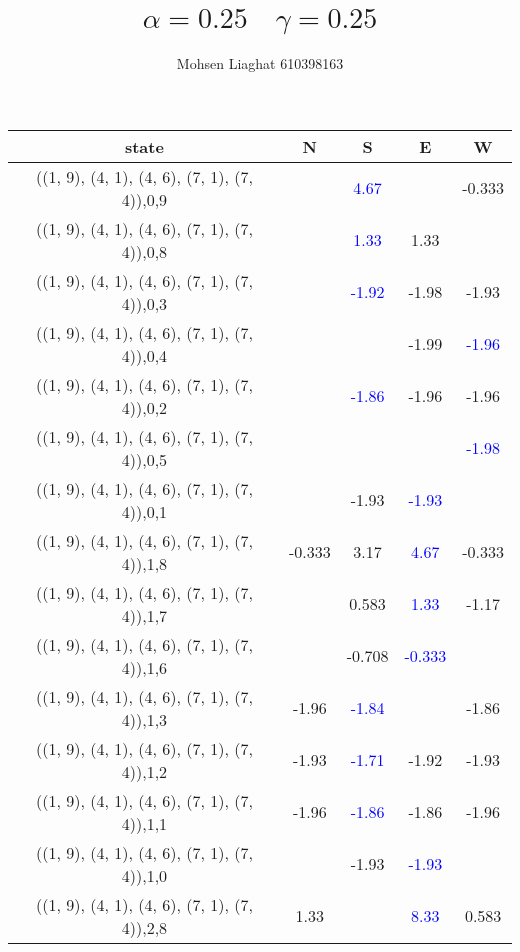 \documentclass{article}
\title{$\alpha = 0.25\quad \gamma = 0.25 $}
\author{Mohsen Liaghat 610398163}
\begin{document}
	\maketitle
	\begin{center}
        \begin{longtable}{|c|c|c|c|c|}
        	state & N & S & E & W \\
        	\hline
        	\hline
        	((1, 9), (4, 1), (4, 6), (7, 1), (7, 4)),0,9&& \textcolor{blue}{4.67}&&-0.333\\
        	\hline
        	((1, 9), (4, 1), (4, 6), (7, 1), (7, 4)),0,8&& \textcolor{blue}{1.33}&1.33&\\
        	\hline
        	((1, 9), (4, 1), (4, 6), (7, 1), (7, 4)),0,3&& \textcolor{blue}{-1.92}&-1.98&-1.93\\
        	\hline
        	((1, 9), (4, 1), (4, 6), (7, 1), (7, 4)),0,4&&&-1.99& \textcolor{blue}{-1.96}\\
        	\hline
        	((1, 9), (4, 1), (4, 6), (7, 1), (7, 4)),0,2&& \textcolor{blue}{-1.86}&-1.96&-1.96\\
        	\hline
        	((1, 9), (4, 1), (4, 6), (7, 1), (7, 4)),0,5&&&& \textcolor{blue}{-1.98}\\
        	\hline
        	((1, 9), (4, 1), (4, 6), (7, 1), (7, 4)),0,1&&-1.93& \textcolor{blue}{-1.93}&\\
        	\hline
        	((1, 9), (4, 1), (4, 6), (7, 1), (7, 4)),1,8&-0.333&3.17& \textcolor{blue}{4.67}&-0.333\\
        	\hline
        	((1, 9), (4, 1), (4, 6), (7, 1), (7, 4)),1,7&&0.583& \textcolor{blue}{1.33}&-1.17\\
        	\hline
        	((1, 9), (4, 1), (4, 6), (7, 1), (7, 4)),1,6&&-0.708& \textcolor{blue}{-0.333}&\\
        	\hline
        	((1, 9), (4, 1), (4, 6), (7, 1), (7, 4)),1,3&-1.96& \textcolor{blue}{-1.84}&&-1.86\\
        	\hline
        	((1, 9), (4, 1), (4, 6), (7, 1), (7, 4)),1,2&-1.93& \textcolor{blue}{-1.71}&-1.92&-1.93\\
        	\hline
        	((1, 9), (4, 1), (4, 6), (7, 1), (7, 4)),1,1&-1.96& \textcolor{blue}{-1.86}&-1.86&-1.96\\
        	\hline
        	((1, 9), (4, 1), (4, 6), (7, 1), (7, 4)),1,0&&-1.93& \textcolor{blue}{-1.93}&\\
        	\hline
        	((1, 9), (4, 1), (4, 6), (7, 1), (7, 4)),2,8&1.33&& \textcolor{blue}{8.33}&0.583\\

\end{longtable}
\end{center}
\end{document}
